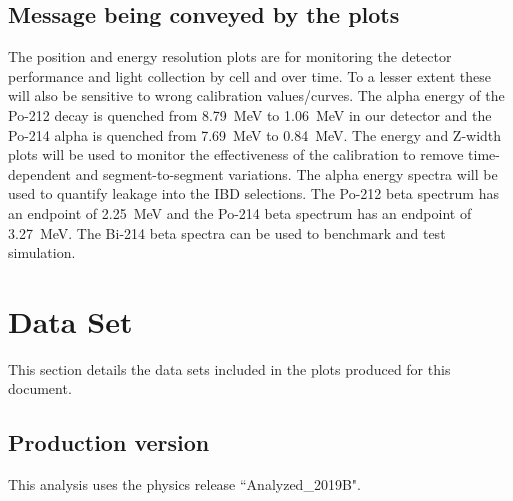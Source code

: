 \subsection{Message being conveyed by the plots}
The position and energy resolution plots are for monitoring the detector performance and light collection by cell and over time. To a lesser extent these will also be sensitive to wrong calibration values/curves. The alpha energy of the Po-212 decay is quenched from 8.79~MeV to 1.06~MeV in our detector and the Po-214 alpha is quenched from 7.69~MeV to 0.84~MeV. The energy and Z-width plots will be used to monitor the effectiveness of the calibration to remove time-dependent and segment-to-segment variations. The alpha energy spectra will be used to quantify leakage into the IBD selections. The Po-212 beta spectrum has an endpoint of 2.25~MeV and the Po-214 beta spectrum has an endpoint of 3.27~MeV. The Bi-214 beta spectra can be used to benchmark and test simulation.

\section{Data Set}
This section details the data sets included in the plots produced for this document.
\subsection{Production version}
This analysis uses the physics release ``Analyzed\_2019B".
